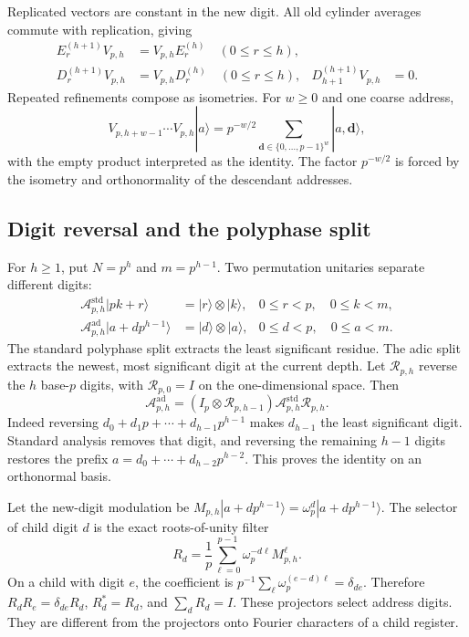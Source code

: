 Replicated vectors are constant in the new digit. All old cylinder
averages commute with replication, giving
\begin{align}
 E_r^{(h+1)}V_{p,h}&=V_{p,h}E_r^{(h)}\quad(0\leq r\leq h),
 \nonumber\\
 D_r^{(h+1)}V_{p,h}&=V_{p,h}D_r^{(h)}\quad(0\leq r\leq h),
 &D_{h+1}^{(h+1)}V_{p,h}&=0.
 \label{a-finite-detail-intertwining}
\end{align}
Repeated refinements compose as isometries. For $w\geq0$ and one
coarse address,
\begin{equation}
 V_{p,h+w-1}\cdots V_{p,h}|a\rangle
 =p^{-w/2}\sum_{\mathbf d\in\{0,\ldots,p-1\}^w}|a,\mathbf d\rangle,
 \label{a-finite-nested-refinement}
\end{equation}
with the empty product interpreted as the identity. The factor
$p^{-w/2}$ is forced by the isometry and orthonormality of the
descendant addresses.

\subsection{Digit reversal and the polyphase split}
\label{a-finite-polyphase}

For $h\geq1$, put $N=p^h$ and $m=p^{h-1}$. Two permutation
unitaries separate different digits:
\begin{align}
 \mathcal A^{\mathrm{std}}_{p,h}|pk+r\rangle
 &=|r\rangle\otimes|k\rangle,
 &0\leq r<p,\quad0\leq k<m,\nonumber\\
 \mathcal A^{\mathrm{ad}}_{p,h}|a+d p^{h-1}\rangle
 &=|d\rangle\otimes|a\rangle,
 &0\leq d<p,\quad0\leq a<m.
 \label{a-finite-digit-splits}
\end{align}
The standard polyphase split extracts the least significant residue.
The adic split extracts the newest, most significant digit at the
current depth. Let $\mathcal R_{p,h}$ reverse the $h$ base-$p$ digits,
with $\mathcal R_{p,0}=I$ on the one-dimensional space. Then
\begin{equation}
 \mathcal A^{\mathrm{ad}}_{p,h}=
 (I_p\otimes\mathcal R_{p,h-1})
 \mathcal A^{\mathrm{std}}_{p,h}\mathcal R_{p,h}.
 \label{a-finite-digit-reversal}
\end{equation}
Indeed reversing $d_0+d_1p+\cdots+d_{h-1}p^{h-1}$ makes
$d_{h-1}$ the least significant digit. Standard analysis removes that
digit, and reversing the remaining $h-1$ digits restores the prefix
$a=d_0+\cdots+d_{h-2}p^{h-2}$. This proves the identity on an
orthonormal basis.

Let the new-digit modulation be
$M_{p,h}|a+d p^{h-1}\rangle=\omega_p^d|a+d p^{h-1}\rangle$.
The selector of child digit $d$ is the exact roots-of-unity filter
\begin{equation}
 R_d=\frac1p\sum_{\ell=0}^{p-1}\omega_p^{-d\ell}M_{p,h}^{\ell}.
 \label{a-finite-root-selector}
\end{equation}
On a child with digit $e$, the coefficient is
$p^{-1}\sum_\ell\omega_p^{(e-d)\ell}=\delta_{de}$. Therefore
$R_dR_e=\delta_{de}R_d$, $R_d^*=R_d$, and $\sum_dR_d=I$.
These projectors select address digits. They are different from the
projectors onto Fourier characters of a child register.

